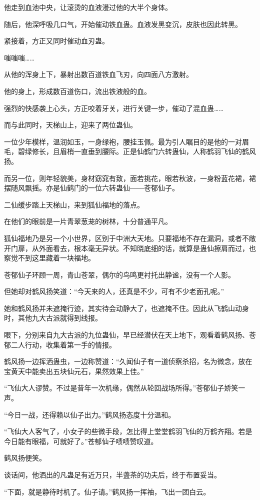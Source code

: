 \begin{this_body}
他走到血池中央，让滚烫的血液漫过他的大半个身体。

随后，他深呼吸几口气，开始催动铁血蛊。血液发黑变沉，皮肤也因此转黑。

紧接着，方正又同时催动血刃蛊。

嗤嗤嗤……

从他的浑身上下，暴射出数百道铁血飞刃，向四面八方激射。

他的身上，形成数百道伤口，流出铁液般的血。

强烈的快感袭上心头，方正咬着牙关，进行关键一步，催动了混血蛊……

而与此同时，天梯山上，迎来了两位蛊仙。

一位少年模样，温润如玉，一身绿袍，腰挂玉佩。最为引人瞩目的是他的一对眉毛，碧绿修长，且眉梢一直垂到腰际。正是仙鹤门六转蛊仙，人称鹤羽飞仙的鹤风扬。

而另一位，则年轻貌美，身材窈窕有致，面若挑花，眼若秋波，一身粉蓝花裙，裙摆随风飘摇。亦是仙鹤门的一位六转蛊仙――苍郁仙子。

二仙缓步踏上天梯山，来到狐仙福地的落点。

在他们的眼前是一片青翠葱茏的树林，十分普通平凡。

狐仙福地乃是另一个小世界，区别于中洲大天地。只要福地不存在漏洞，或者不敞开门扉，从外面看去，根本毫无异状。不知晓底细的话，就算是蛊仙擦肩而过，也察觉不到这里藏着一块福地。

苍郁仙子环顾一周，青山苍翠，偶尔的鸟鸣更衬托出静谧，没有一个人影。

但她却对鹤风扬笑道：“今天来的人，还真是不少，可有不少老面孔呢。”

她和鹤风扬并未遮掩行迹，其实待会动静大了，也遮掩不住。因此从飞鹤山动身时，其他九大古派就得到线报。

眼下，分别来自九大古派的九位蛊仙，早已经潜伏在天上地下，观看着鹤风扬、苍郁二人行动，收集着第一手的情报。

鹤风扬一边挥洒蛊虫，一边称赞道：“久闻仙子有一道侦察杀招，名为微念，放在宝黄天中能卖出五块仙元石，果然效果上佳。”

“飞仙大人谬赞。不过是昔年一次机缘，偶然从轮回战场所得。”苍郁仙子娇笑一声。

“今日一战，还得赖以仙子出力。”鹤风扬态度十分温和。

“飞仙大人客气了，小女子的些微手段，怎比得上堂堂鹤羽飞仙的万鹤齐翔。若是今日能有眼福，可就好了。”苍郁仙子啧啧赞叹道。

鹤风扬便笑。

谈话间，他洒出的凡蛊足有近万只，半盏茶的功夫后，终于布置妥当。

“下面，就是静待时机了。仙子请。”鹤风扬一挥袖，飞出一团白云。


\end{this_body}
